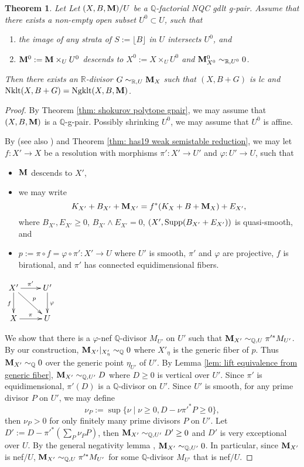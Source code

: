 \documentclass[11pt]{amsart}
\numberwithin{equation}{section}
\newcommand{\Mm}{{\bf{M}}}
\newcommand{\Qq}{\mathbb{Q}}
\newcommand{\Rr}{\mathbb{R}}
\newcommand{\Nklt}{\operatorname{Nklt}}
\newcommand{\Ngklt}{\operatorname{Ngklt}}
\newtheorem{thm}{Theorem}[section]
\theoremstyle{definition}
\theoremstyle{definition}
\theoremstyle{definition}
\begin{document}
\begin{thm}\label{thm: reduce special gpair to pair}
Let Let $(X,B,\Mm)/U$ be a $\Qq$-factorial NQC gdlt g-pair. Assume that there exists a non-empty open subset $U^0\subset U$, such that
\begin{enumerate}
    \item the image of any strata of $S:=\lfloor B\rfloor$ in $U$ intersects $U^0$, and
    \item $\Mm^0:=\Mm\times_UU^0$ descends to $X^0:=X\times_UU^0$ and $\Mm^0_{X^0}\sim_{\Rr,U^0}0$.
\end{enumerate}
Then there exists an $\Rr$-divisor $G\sim _{\Rr,U}\Mm _X$ such that $(X,B+G)$ is lc and $\Nklt(X,B+G)=\Ngklt(X,B,\Mm)$.
\end{thm}
\begin{proof}
By Theorem \ref{thm: shokurov polytope gpair}, we may assume that $(X,B,\Mm)$ is a $\Qq$-g-pair. Possibly shrinking $U^0$, we may assume that $U^0$ is affine.


 By \cite[Proposition 6-1-3, Remark 6-1-4]{KMM87} (see also \cite[Lemma 6]{Nak86}) and Theorem \ref{thm: has19 weak semistable reduction}, we may let $f: X'\to X$ be a resolution with morphisms $\pi': X'\rightarrow U'$ and $\varphi: U'\rightarrow U$, such that
\begin{itemize}
\item $\Mm$ descends to $X'$,
\item we may write
$$K_{X'}+B_{X'}+\Mm_{X'}=f^*(K_X+B+\Mm_X)+E_{X'},$$
where $B_{X'},E_{X'}\geq 0$, $B_{X'}\wedge E_{X'}=0$, $(X',{\rm Supp}(B_{X'}+E_{X'}))$ is quasi-smooth, and
    \item $p:=\pi\circ f=\varphi\circ\pi': X'\to U$ where  $U'$ is smooth, $\pi'$ and $\varphi$ are projective, $f$ is birational, and $\pi'$ has connected equidimensional fibers.
\end{itemize}
\begin{center}$\xymatrix{
X'\ar@{->}[r]^{\pi'}\ar@{->}[d]_{f}\ar@{->}[dr]^{p} & U'\ar@{->}[d]^{\varphi}\\
X\ar@{->}[r]^{\pi} & U
}$
\end{center}
We show that there is a $\varphi$-nef $\mathbb Q$-divisor $M_{U'}$ on $U'$ such that $\Mm_{X'}\sim_{\Qq,U}\pi'^*M_{U'}$. By our construction, $\Mm_{X'}|_{X'_{\eta}}\sim_{\Qq}0$ where $X'_{\eta}$ is the generic fiber of $p$. Thus $\Mm_{X'}\sim_{\Qq}0$ over the generic point $\eta_{U'}$ of $U'$. By Lemma \ref{lem: lift equivalence from generic fiber}, $\Mm_{X'}\sim_{\Qq,U'} D$ where $D\geq 0$ is vertical over $U'$. Since $\pi'$ is equidimensional, $\pi'(D)$ is a $\Qq$-divisor on $U'$. Since $U'$ is smooth, for any prime divisor $P$ on $U'$, we may define
$$\nu_{P}:=\sup\{\nu\mid \nu\geq 0, D-\nu\pi'^*P\geq 0\},$$
then $\nu_P>0$ for only finitely many prime divisors $P$ on $U'$. Let $D':=D-\pi'^*(\sum_P\nu_{P}P)$, then $\Mm_{X'}\sim_{\Qq,U'} D'\geq 0$ and $D'$ is very exceptional over $U$. By the general negativity lemma \cite[Lemma 3.3]{Bir12a}, $\Mm_{X'}\sim_{\Qq,U'}0$. In particular, since $\Mm_{X'}$ is nef$/U$, $\Mm_{X'}\sim_{\Qq,U}\pi'^*M_{U'}$ for some $\Qq$-divisor $M_{U'}$ that is nef$/U$.



\end{proof}
\end{document}
